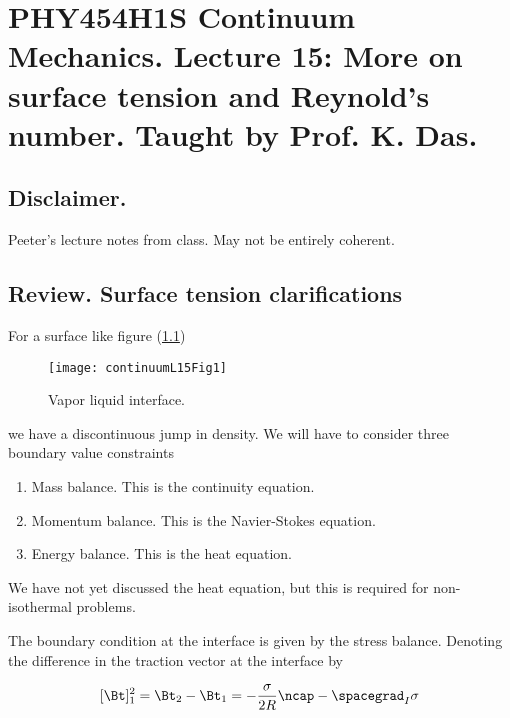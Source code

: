 
%

\chapter{PHY454H1S Continuum Mechanics.  Lecture 15: More on surface tension and Reynold's number.  Taught by Prof. K. Das.}
\label{chap:continuumL15}
{}
\date{Mar 9, 2012}

\beginArtWithToc

\section{Disclaimer.}

Peeter's lecture notes from class.  May not be entirely coherent.

\section{Review.  Surface tension clarifications}

For a surface like figure (\ref{fig:continuumL15:continuumL15Fig1})
\begin{figure}[htp]
   \centering
   \texttt{[image: continuumL15Fig1]}
   \caption{Vapor liquid interface.}\label{fig:continuumL15:continuumL15Fig1}
\end{figure}

we have a discontinuous jump in density.  We will have to consider three boundary value constraints

\begin{enumerate}
\item Mass balance.  This is the continuity equation.
\item Momentum balance.  This is the Navier-Stokes equation.
\item Energy balance.  This is the heat equation.
\end{enumerate}

We have not yet discussed the heat equation, but this is required for non-isothermal problems.

The boundary condition at the interface is given by the stress balance.  Denoting the difference in the traction vector at the interface by

\begin{equation}\label{eqn:inclinedFlowWithoutConstantHeightAssumption:130}
[\Bt]_1^2 = \Bt_2 - \Bt_1 = -\frac{\sigma}{2 R} \ncap - \spacegrad_I \sigma
\end{equation}

